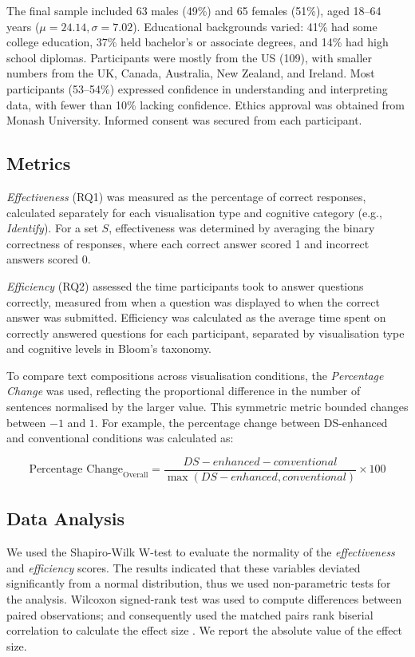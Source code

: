 The final sample included 63 males (49\%) and 65 females (51\%), aged 18–64 years ($\mu = 24.14, \sigma = 7.02$). Educational backgrounds varied: 41\% had some college education, 37\% held bachelor’s or associate degrees, and 14\% had high school diplomas. Participants were mostly from the US (109), with smaller numbers from the UK, Canada, Australia, New Zealand, and Ireland. Most participants (53–54\%) expressed confidence in understanding and interpreting data, with fewer than 10\% lacking confidence. Ethics approval was obtained from Monash University. Informed consent was secured from each participant.

\subsection{Metrics} 
\textit{Effectiveness} (RQ1) was measured as the percentage of correct responses, calculated separately for each visualisation type and cognitive category (e.g., \textit{Identify}). For a set \( S \), effectiveness was determined by averaging the binary correctness of responses, where each correct answer scored 1 and incorrect answers scored 0.

\textit{Efficiency} (RQ2) assessed the time participants took to answer questions correctly, measured from when a question was displayed to when the correct answer was submitted. Efficiency was calculated as the average time spent on correctly answered questions for each participant, separated by visualisation type and cognitive levels in Bloom’s taxonomy.

To compare text compositions across visualisation conditions, the \textit{Percentage Change} was used, reflecting the proportional difference in the number of sentences normalised by the larger value. This symmetric metric bounded changes between \(-1\) and \(1\). For example, the percentage change between DS-enhanced and conventional conditions was calculated as:

\[
\text{Percentage Change}_{\text{Overall}} = \frac{DS-enhanced - conventional}{\max(DS-enhanced, conventional)}\times 100
\]


\subsection{Data Analysis}
We used the Shapiro-Wilk W-test to evaluate the normality of the \textit{effectiveness} and \textit{efficiency} scores. The results indicated that these variables deviated significantly from a normal distribution, thus we used non-parametric tests for the analysis. Wilcoxon signed-rank test was used to compute differences between paired observations; and consequently used the matched pairs rank biserial correlation to calculate the effect size \cite{kerby2014simple}. We report the absolute value of the effect size. 

